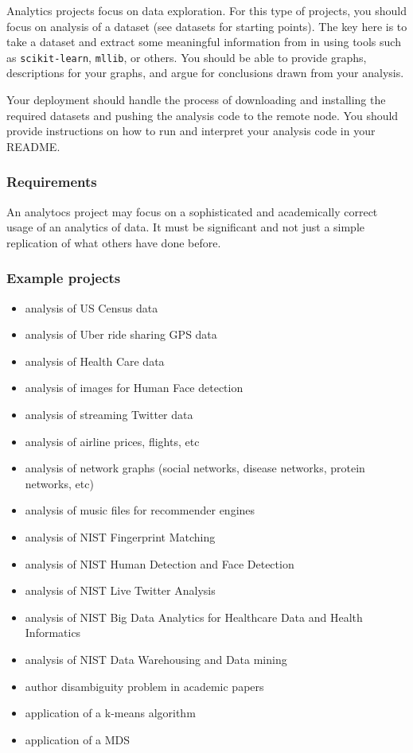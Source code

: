 Analytics projects focus on data exploration. For this type of projects,
you should focus on analysis of a dataset (see datasets for starting
points). The key here is to take a dataset and extract some meaningful
information from in using tools such as \texttt{scikit-learn},
\texttt{mllib}, or others. You should be able to provide graphs,
descriptions for your graphs, and argue for conclusions drawn from your
analysis.

Your deployment should handle the process of downloading and installing
the required datasets and pushing the analysis code to the remote node.
You should provide instructions on how to run and interpret your
analysis code in your README.

\subsubsection{Requirements}\label{requirements-1}

An analytocs project may focus on a sophisticated and academically
correct usage of an analytics of data. It must be significant and not
just a simple replication of what others have done before.

\subsubsection{Example projects}\label{example-projects-1}

\begin{itemize}

\item
  analysis of US Census data
\item
  analysis of Uber ride sharing GPS data
\item
  analysis of Health Care data
\item
  analysis of images for Human Face detection
\item
  analysis of streaming Twitter data
\item
  analysis of airline prices, flights, etc
\item
  analysis of network graphs (social networks, disease networks, protein
  networks, etc)
\item
  analysis of music files for recommender engines
\item
  analysis of NIST Fingerprint Matching
\item
  analysis of NIST Human Detection and Face Detection
\item
  analysis of NIST Live Twitter Analysis
\item
  analysis of NIST Big Data Analytics for Healthcare Data and Health
  Informatics
\item
  analysis of NIST Data Warehousing and Data mining
\item
  author disambiguity problem in academic papers
\item
  application of a k-means algorithm
\item
  application of a MDS
\end{itemize}

